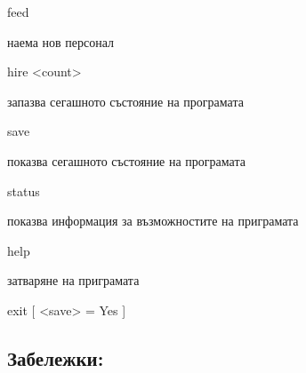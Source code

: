 \begin{DoxyCode}
feed
\end{DoxyCode}



\begin{DoxyItemize}
\item наема нов персонал
\end{DoxyItemize}


\begin{DoxyCode}
hire <count>
\end{DoxyCode}



\begin{DoxyItemize}
\item запазва сегашното състояние на програмата
\end{DoxyItemize}


\begin{DoxyCode}
save
\end{DoxyCode}



\begin{DoxyItemize}
\item показва сегашното състояние на програмата
\end{DoxyItemize}


\begin{DoxyCode}
status
\end{DoxyCode}



\begin{DoxyItemize}
\item показва информация за възможностите на приграмата
\end{DoxyItemize}


\begin{DoxyCode}
help
\end{DoxyCode}



\begin{DoxyItemize}
\item затваряне на приграмата
\end{DoxyItemize}


\begin{DoxyCode}
exit [ <save> = Yes ]
\end{DoxyCode}


\subsection*{Забележки\+:}


